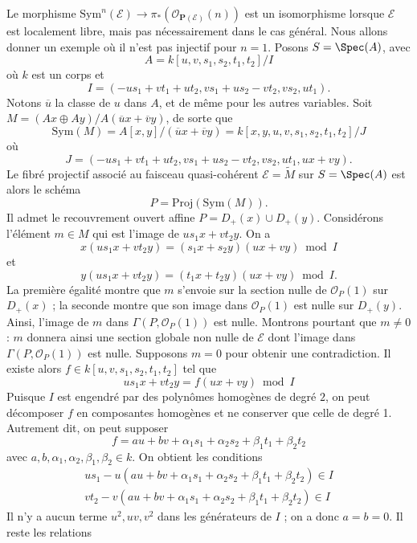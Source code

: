 \begin{example}
\label{example-projective-bundle}
Le morphisme $\text{Sym}^n(\mathcal{E}) \to
\pi_*(\mathcal{O}_{\mathbf{P}(\mathcal{E})}(n))$ est un isomorphisme lorsque
$\mathcal{E}$ est localement libre, mais pas nécessairement dans le cas
général. Nous allons donner un exemple où il n'est pas injectif pour
$n = 1$. Posons $S = \Spec(A)$, avec
$$
A = k[u, v, s_1, s_2, t_1, t_2]/I
$$
où $k$ est un corps et
$$
I = (-us_1 + vt_1 + ut_2, vs_1 + us_2 - vt_2, vs_2, ut_1).
$$
Notons $\overline{u}$ la classe de $u$
dans $A$, et de même pour les autres
variables. Soit $M = (Ax \oplus Ay)/A(\overline{u}x + \overline{v}y)$,
de sorte que
$$
\text{Sym}(M) = A[x, y]/(\overline{u}x + \overline{v}y)
= k[x, y, u, v, s_1, s_2, t_1, t_2]/J
$$
où
$$
J = (-us_1 + vt_1 + ut_2, vs_1 + us_2 - vt_2, vs_2, ut_1, ux + vy).
$$
Le fibré projectif associé au faisceau quasi-cohérent
$\mathcal{E} = \widetilde{M}$ sur $S = \Spec(A)$ est alors le schéma
$$
P =
\text{Proj}(\text{Sym}(M)).
$$
Il admet le recouvrement ouvert affine $P = D_{+}(x) \cup D_{+}(y)$.
Considérons l'élément $m \in M$ qui est l'image de $us_1x + vt_2y$.
On a
$$
x(us_1x + vt_2y) = (s_1x + s_2y)(ux + vy) \bmod I
$$
et
$$
y(us_1x + vt_2y) = (t_1x + t_2y)(ux + vy) \bmod I.
$$
La première égalité montre que $m$ s'envoie sur la section nulle de
$\mathcal{O}_P(1)$ sur $D_{+}(x)$ ; la seconde montre
que son image dans $\mathcal{O}_P(1)$ est nulle
sur $D_{+}(y)$. Ainsi, l'image de $m$ dans
$\Gamma(P, \mathcal{O}_P(1))$ est nulle.
Montrons pourtant que $m \not = 0$ : $m$ donnera ainsi une section globale
non nulle de $\mathcal{E}$ dont l'image dans
$\Gamma(P, \mathcal{O}_P(1))$ est nulle. Supposons $m = 0$ pour obtenir
une contradiction. Il existe alors
$f \in k[u, v, s_1, s_2, t_1, t_2]$ tel que
$$
us_1x + vt_2y = f(ux + vy) \bmod I
$$
Puisque $I$ est engendré par des polynômes homogènes de degré $2$, on peut
décomposer $f$ en composantes homogènes et ne conserver que celle de degré
1. Autrement dit, on peut supposer
$$
f = au + bv + \alpha_1s_1 + \alpha_2s_2 + \beta_1t_1 + \beta_2t_2
$$
avec $a, b, \alpha_1, \alpha_2, \beta_1, \beta_2 \in k$.
On obtient les conditions
$$
\begin{matrix}
us_1 - u(au + bv + \alpha_1s_1 + \alpha_2s_2 + \beta_1t_1 + \beta_2t_2)
\in I \\
vt_2 - v(au + bv + \alpha_1s_1 + \alpha_2s_2 + \beta_1t_1 + \beta_2t_2)
\in I
\end{matrix}
$$
Il n'y a aucun terme $u^2, uv, v^2$ dans les générateurs de $I$ ;
on a donc $a = b = 0$. Il reste les relations

\end{example}
